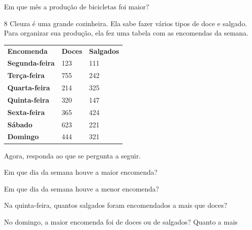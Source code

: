 {{{{\begin{escolha}

\item Em que mês a produção de bicicletas foi maior?

\end{escolha}

\num{8} Cleuza é uma grande cozinheira. Ela sabe fazer vários tipos de
doce e salgado. Para organizar sua produção, ela fez uma tabela com as
encomendas da semana.

\begin{table}[H]\centering
\begin{tabular}{lll}
\textbf{Encomenda}     & \textbf{Doces} & \textbf{Salgados} \\
\textbf{Segunda-feira} & 123            & 111               \\
\textbf{Terça-feira}   & 755            & 242               \\
\textbf{Quarta-feira}  & 214            & 325               \\
\textbf{Quinta-feira}  & 320            & 147               \\
\textbf{Sexta-feira}   & 365            & 424               \\
\textbf{Sábado}        & 623            & 221               \\
\textbf{Domingo}       & 444            & 321              
\end{tabular}
\end{table}

Agora, responda ao que se pergunta a seguir.

\begin{escolha}
\item Em que dia da semana houve a maior encomenda?


\item Em que dia da semana houve a menor encomenda?


\item Na quinta-feira, quantos salgados foram encomendados a mais que doces?


\item No domingo, a maior encomenda foi de doces ou de salgados? Quanto a mais


\end{escolha}}}}}
